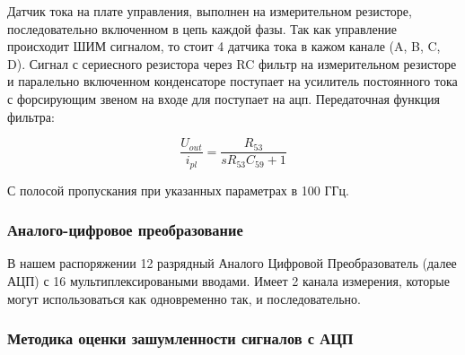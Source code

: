 Датчик тока на плате управления, выполнен на измерительном резисторе, последовательно
включенном в цепь каждой фазы. Так как управление происходит ШИМ сигналом, то стоит 4
датчика тока в кажом канале (A, B, C, D).
Сигнал с сериесного резистора через RC фильтр на измерительном резисторе и паралельно включенном
конденсаторе поступает на усилитель постоянного тока с форсирующим звеном на входе для поступает на ацп.
Передаточная функция фильтра:

$$
    \frac{ U_{out} }{ i_{pl} } = \frac{ R_{53} }{ s R_{53} C_{59} + 1 }
$$

С полосой пропускания при указанных параметрах в 100 ГГц.

\subsubsection{ Аналого-цифровое преобразование }
В нашем распоряжении 12 разрядный Аналого Цифровой Преобразователь (далее АЦП) с 16
мультиплексироваными вводами.
Имеет 2 канала измерения, которые могут использоваться как одновременно так, и последовательно.

\subsubsection{ Методика оценки зашумленности сигналов с АЦП }

\endinput

